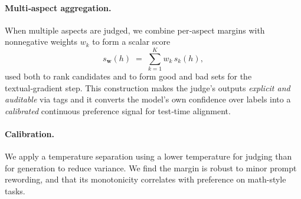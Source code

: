 \documentclass[11pt]{article}
\theoremstyle{plain}
\theoremstyle{definition}
\theoremstyle{remark}
\begin{document}
\paragraph{Multi‑aspect aggregation.} When multiple aspects are judged, we combine per‑aspect margins with nonnegative weights \(w_k\) to form a scalar score
\[
  s_{\mathbf{w}}(h)\;=\;\sum_{k=1}^{K} w_k\, s_k(h),
\]
used both to rank candidates and to form good and bad sets for the textual‑gradient step. This construction makes the judge’s outputs \emph{explicit and auditable} via tags and it converts the model’s own confidence over labels into a \emph{calibrated} continuous preference signal for test‑time alignment.

\paragraph{Calibration.} We apply a temperature separation using a lower temperature for judging than for generation to reduce variance. We find the margin is robust to minor prompt rewording, and that its monotonicity correlates with preference on math-style tasks.

\end{document}

